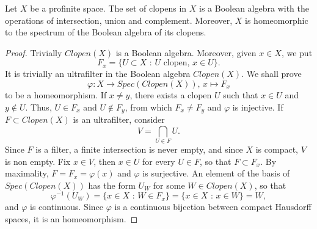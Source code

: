 \begin{lemma}
\label{lem:Clopen(X)}
    Let $X$ be a profinite space. The set of clopens in $X$ is a Boolean algebra with the operations of intersection, union and complement. Moreover, $X$ is homeomorphic to the spectrum of the Boolean algebra of its clopens.
    \begin{proof}
        Trivially $Clopen(X)$ is a Boolean algebra. Moreover, given $x\in X$, we put
        \[ F_x = \{ U\subset X \text{ : } U \text{ clopen, } x\in U\}. \]
        It is trivially an ultrafilter in the Boolean algebra $Clopen(X)$. We shall prove
        \[ \varphi:X\longrightarrow Spec(Clopen(X))\text{, }x\longmapsto F_x \]
        to be a homeomorphism. If $x\not= y$, there exists a clopen $U$ such that $x\in U$ and $y\not\in U$. Thus, $U\in F_x$ and $U\not\in F_y$, from which $F_x\not= F_y$ and $\varphi$ is injective. If $F\subset Clopen(X)$ is an ultrafilter, consider
        \[ V = \bigcap_{U\in F} U. \]
        Since $F$ is a filter, a finite intersection is never empty, and since $X$ is compact, $V$ is non empty. Fix $x\in V$, then $x\in U$ for every $U\in F$, so that $F\subset F_x$. By maximality, $F = F_x = \varphi(x)$ and $\varphi$ is surjective. An element of the basis of $Spec(Clopen(X))$ has the form $U_W$ for some $W\in Clopen(X)$, so that
        \[ \varphi^{-1}(U_W) = \{x\in X\text{ : }W\in F_x\} = \{x\in X\text{ : }x\in W\} = W, \]
        and $\varphi$ is continuous. Since $\varphi$ is a continuous bijection between compact Hausdorff spaces, it is an homeomorphism.
    \end{proof}
\end{lemma}

